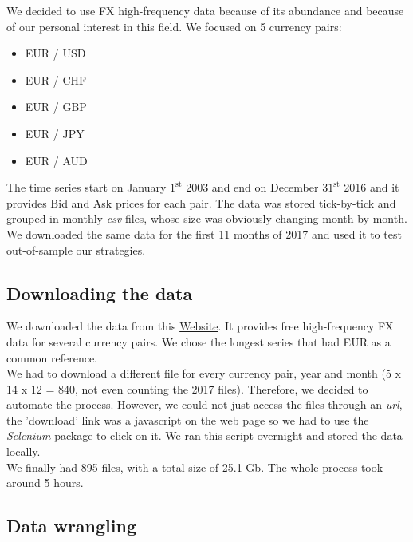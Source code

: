\documentclass[a4paper]{article}
\begin{document}
We decided to use FX high-frequency data because of its abundance and because of our personal interest in this field. We focused on 5 currency pairs:
\begin{itemize}
\item EUR / USD
\item EUR / CHF
\item EUR / GBP
\item EUR / JPY
\item EUR / AUD
\end{itemize}
The time series start on January $1^{\text{st}}$ 2003 and end on December $31^{\text{st}}$ 2016 and it provides Bid and Ask prices for each pair. The data was stored tick-by-tick and grouped in monthly \emph{csv} files, whose size was obviously changing month-by-month.\\
We downloaded the same data for the first 11 months of 2017 and used it to test out-of-sample our strategies.


\subsection{Downloading the data} 

We downloaded the data from this \href{http://www.histdata.com/download-free-forex-historical-data/?/ascii/tick-data-quotes}{Website}. It provides free high-frequency FX data for several currency pairs. We chose the longest series that had EUR as a common reference.\\
We had to download a different file for every currency pair, year and month (5 x 14 x 12 = 840, not even counting the 2017 files). Therefore, we decided to automate the process. However, we could not just access the files through an \emph{url}, the 'download' link was a javascript on the web page so we had to use the \emph{Selenium} package to click on it. We ran this script overnight and stored the data locally. \\
We finally had 895 files, with a total size of 25.1 Gb. The whole process took around 5 hours.

\subsection{Data wrangling} 
\end{document}
